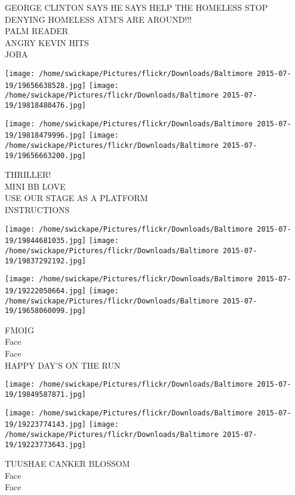 \documentclass[10pt,letterpaper]{article}
\begin{document}
GEORGE CLINTON SAYS HE SAYS HELP THE HOMELESS STOP DENYING HOMELESS ATM'S ARE AROUND!!!\\
PALM READER\\
ANGRY KEVIN HITS\\
JOBA\\
\pagebreak

\texttt{[image: /home/swickape/Pictures/flickr/Downloads/Baltimore 2015-07-19/19656638528.jpg]}
\texttt{[image: /home/swickape/Pictures/flickr/Downloads/Baltimore 2015-07-19/19818480476.jpg]}

\texttt{[image: /home/swickape/Pictures/flickr/Downloads/Baltimore 2015-07-19/19818479996.jpg]}
\texttt{[image: /home/swickape/Pictures/flickr/Downloads/Baltimore 2015-07-19/19656663200.jpg]}

THRILLER!\\
MINI BB LOVE\\
USE OUR STAGE AS A PLATFORM\\
INSTRUCTIONS\\
\pagebreak

\texttt{[image: /home/swickape/Pictures/flickr/Downloads/Baltimore 2015-07-19/19844681035.jpg]}
\texttt{[image: /home/swickape/Pictures/flickr/Downloads/Baltimore 2015-07-19/19837292192.jpg]}

\texttt{[image: /home/swickape/Pictures/flickr/Downloads/Baltimore 2015-07-19/19222050664.jpg]}
\texttt{[image: /home/swickape/Pictures/flickr/Downloads/Baltimore 2015-07-19/19658060099.jpg]}

FMOIG\\
Face\\
Face\\
HAPPY DAY'S ON THE RUN\\
\pagebreak

\texttt{[image: /home/swickape/Pictures/flickr/Downloads/Baltimore 2015-07-19/19849587871.jpg]}

\vspace{0.25in}
\texttt{[image: /home/swickape/Pictures/flickr/Downloads/Baltimore 2015-07-19/19223774143.jpg]}
\texttt{[image: /home/swickape/Pictures/flickr/Downloads/Baltimore 2015-07-19/19223773643.jpg]}

TUUSHAE CANKER BLOSSOM\\
Face\\
Face\\
\pagebreak
\end{document}
